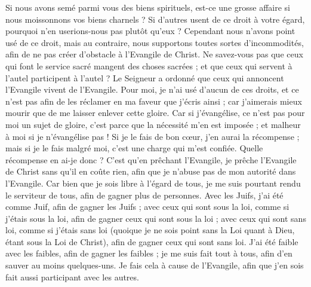 \begin{multicols}{2}
Si nous avons semé parmi vous des biens spirituels, est-ce une grosse affaire si nous moissonnons vos biens charnels ?
Si d'autres usent de ce droit à votre égard, pourquoi n'en userions-nous pas plutôt qu'eux ? Cependant nous n'avons point usé de ce droit, mais au contraire, nous supportons toutes sortes d'incommodités, afin de ne pas créer d'obstacle à l'Evangile de Christ.
Ne savez-vous pas que ceux qui font le service sacré mangent des choses sacrées ; et que ceux qui servent à l'autel participent à l'autel ?
Le Seigneur a ordonné que ceux qui annoncent l'Evangile vivent de l'Evangile.
Pour moi, je n'ai usé d'aucun de ces droits, et ce n'est pas afin de les réclamer en ma faveur que j'écris ainsi ; car j'aimerais mieux mourir que de me laisser enlever cette gloire.
Car si j'évangélise, ce n'est pas pour moi un sujet de gloire, c'est parce que la nécessité m'en est imposée ; et malheur à moi si je n'évangélise pas !
Si je le fais de bon cœur, j'en aurai la récompense ; mais si je le fais malgré moi, c'est une charge qui m'est confiée.
Quelle récompense en ai-je donc ? C'est qu'en prêchant l'Evangile, je prêche l'Evangile de Christ sans qu'il en coûte rien, afin que je n'abuse pas de mon autorité dans l'Evangile.
Car bien que je sois libre à l'égard de tous, je me suis pourtant rendu le serviteur de tous, afin de gagner plus de personnes.
Avec les Juifs, j'ai été comme Juif, afin de gagner les Juifs ; avec ceux qui sont sous la loi, comme si j'étais sous la loi, afin de gagner ceux qui sont sous la loi ;
avec ceux qui sont sans loi, comme si j'étais sans loi (quoique je ne sois point sans la Loi quant à Dieu, étant sous la Loi de Christ), afin de gagner ceux qui sont sans loi.
J'ai été faible avec les faibles, afin de gagner les faibles ; je me suis fait tout à tous, afin d'en sauver au moins quelques-uns.
Je fais cela à cause de l'Evangile, afin que j'en sois fait aussi participant avec les autres.

\end{multicols}
